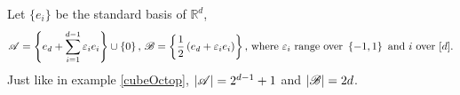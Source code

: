 \begin{example}\label{crosspoly}
    Let $\{e_i\}$ be the standard basis of $\mathbb{R}^d$,
    \begin{equation*}
        {\mathscr{A}}=\left\{e_d+\sum_{i=1}^{d-1}\varepsilon_i e_i\right\}\cup\left\{0\right\}\text{, }{\mathscr{B}}=\left\{\frac{1}{2}\left(e_d+\varepsilon_i e_i\right)\right\}\text{, where }\varepsilon_i\text{ range over }\left\{-1, 1\right\}\text{ and $i$ over }[d].
    \end{equation*}
    Just like in example \ref{cubeOctop}, $\left|{\mathscr{A}}\right|=2^{d-1}+1$ and $\left|{\mathscr{B}}\right|=2d$.
\end{example}